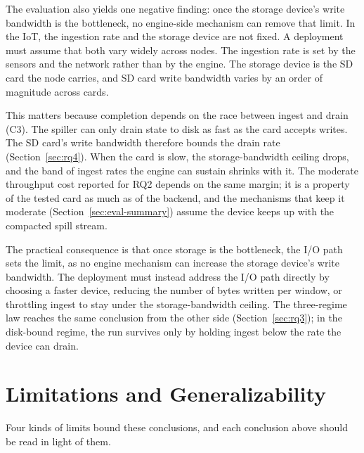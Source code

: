 The evaluation also yields one negative finding: once the storage device's write bandwidth is the bottleneck, no engine-side mechanism can remove that limit.
In the \ac{IoT}, the ingestion rate and the storage device are not fixed.
A deployment must assume that both vary widely across nodes.
The ingestion rate is set by the sensors and the network rather than by the engine.
The storage device is the SD card the node carries, and SD card write bandwidth varies by an order of magnitude across cards.

This matters because completion depends on the race between ingest and drain (C3).
The spiller can only drain state to disk as fast as the card accepts writes.
The SD card's write bandwidth therefore bounds the drain rate (Section~\ref{sec:rq4}).
When the card is slow, the storage-bandwidth ceiling drops, and the band of ingest rates the engine can sustain shrinks with it.
The moderate throughput cost reported for RQ2 depends on the same margin; it is a property of the tested card as much as of the backend, and the mechanisms that keep it moderate (Section~\ref{sec:eval-summary}) assume the device keeps up with the compacted spill stream.

The practical consequence is that once storage is the bottleneck, the I/O path sets the limit, as no engine mechanism can increase the storage device's write bandwidth.
The deployment must instead address the I/O path directly by choosing a faster device, reducing the number of bytes written per window, or throttling ingest to stay under the storage-bandwidth ceiling.
The three-regime law reaches the same conclusion from the other side (Section~\ref{sec:rq3}); in the disk-bound regime, the run survives only by holding ingest below the rate the device can drain.

\section{Limitations and Generalizability\label{sec:generalizability}}

Four kinds of limits bound these conclusions, and each conclusion above should be read in light of them.

